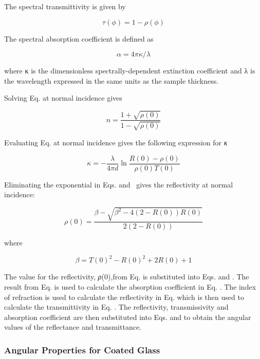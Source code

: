 The spectral transmittivity is given by

\begin{equation}
\tau (\phi ) = 1 - \rho (\phi )
\end{equation}

The spectral absorption coefficient is defined as

\begin{equation}
\alpha  = 4\pi \kappa /\lambda
\end{equation}

where κ is the dimensionless spectrally-dependent extinction coefficient and λ is the wavelength expressed in the same units as the sample thickness.

Solving Eq. at normal incidence gives

\begin{equation}
n = \frac{{1 + \sqrt {\rho (0)} }}{{1 - \sqrt {\rho (0)} }}
\end{equation}

Evaluating Eq. at normal incidence gives the following expression for \emph{κ}

\begin{equation}
\kappa  =  - \frac{\lambda }{{4\pi d}}\ln \frac{{R(0) - \rho (0)}}{{\rho (0)T(0)}}
\end{equation}

Eliminating the exponential in Eqs. and~ gives the reflectivity at normal incidence:

\begin{equation}
\rho (0) = \frac{{\beta  - \sqrt {{\beta ^2} - 4(2 - R(0))R(0)} }}{{2(2 - R(0))}}
\end{equation}

where

\begin{equation}
\beta  = T{(0)^2} - R{(0)^2} + 2R(0) + 1
\end{equation}

The value for the reflectivity, \emph{ρ}(0),from Eq. is substituted into Eqs. and . The result from Eq. is used to calculate the absorption coefficient in Eq. . The index of refraction is used to calculate the reflectivity in Eq. which is then used to calculate the transmittivity in Eq. . The reflectivity, transmissivity and absorption coefficient are then substituted into Eqs. and to obtain the angular values of the reflectance and transmittance.

\subsubsection{Angular Properties for Coated Glass}\label{angular-properties-for-coated-glass}


